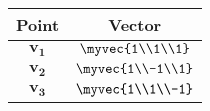 \begin{tabular}[12pt]{ |c| c|}
    \hline
    \textbf{Point} & \textbf{Vector}\\ 
    \hline
    $\mathbf{v_1}$ &  $\myvec{1\\1\\1}$\\
    \hline
    $\mathbf{v_2}$ &   $\myvec{1\\-1\\1}$\\
    \hline
     $\mathbf{v_3}$ &  $\myvec{1\\1\\-1}$\\
    \hline
    \end{tabular}